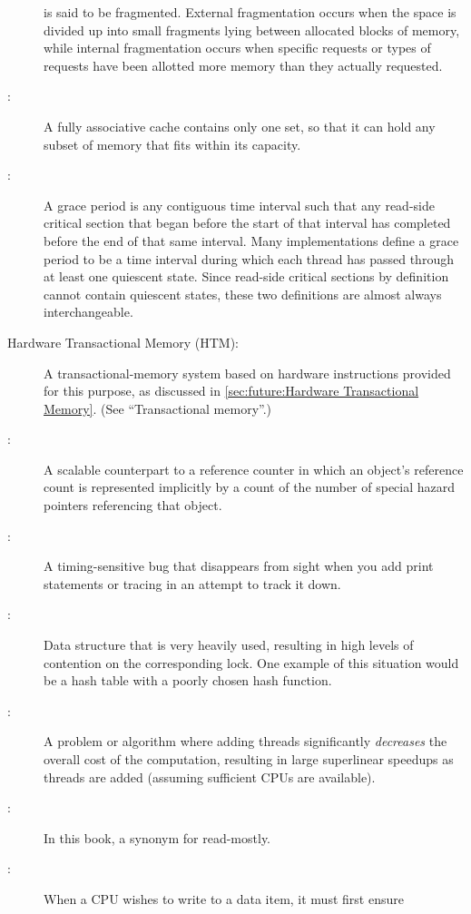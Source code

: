 \begin{description}
	is said to be fragmented.
	External fragmentation occurs when the space is divided up
	into small fragments lying between allocated blocks of memory,
	while internal fragmentation occurs when specific requests or
	types of requests have been allotted more memory than they
	actually requested.
\item[\IXGh{Fully Associative}{Cache}:]
	A fully associative cache contains only
	one set, so that it can hold any subset of
	memory that fits within its capacity.
\item[\IXG{Grace Period}:]
	A grace period is any contiguous time interval such that
	any  read-side critical section that began before the
	start of that interval has
	completed before the end of that same interval.
	Many  implementations define a grace period to be a
	time interval during which each thread has passed through at
	least one quiescent state.
	Since  read-side critical sections by definition cannot
	contain quiescent states, these two definitions are almost
	always interchangeable.
\item[Hardware Transactional Memory (HTM):]
	A transactional-memory system based on hardware instructions
	provided for this purpose, as discussed in
	\cref{sec:future:Hardware Transactional Memory}.
	(See ``Transactional memory''.)
\item[\IXG{Hazard Pointer}:]
	A scalable counterpart to a reference counter in which an
	object's reference count is represented implicitly by a count
	of the number of special hazard pointers referencing that object.
\item[\IXG{Heisenbug}:]
	A timing-sensitive bug that disappears from sight when you
	add print statements or tracing in an attempt to track it
	down.
\item[\IXG{Hot Spot}:]
	Data structure that is very heavily used, resulting in high
	levels of contention on the corresponding lock.
	One example of this situation would be a hash table with
	a poorly chosen hash function.
\item[\IXG{Humiliatingly Parallel}:]
	A problem or algorithm where adding threads significantly
	\emph{decreases} the overall cost of the computation, resulting in
	large superlinear speedups as threads are added (assuming sufficient
	CPUs are available).
\item[\IXG{Immutable}:]
	In this book, a synonym for read-mostly.
\item[\IXG{Invalidation}:]
	When a CPU wishes to write to a data item, it must first ensure

\end{description}
